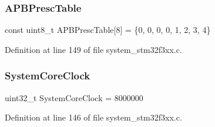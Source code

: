 \subsubsection{A\+P\+B\+Presc\+Table}
{\footnotesize\ttfamily const uint8\+\_\+t A\+P\+B\+Presc\+Table[8] = \{0, 0, 0, 0, 1, 2, 3, 4\}}



Definition at line 149 of file system\+\_\+stm32f3xx.\+c.

\mbox{\label{group___s_t_m32_f3xx___system___private___variables_gaa3cd3e43291e81e795d642b79b6088e6}} 
\subsubsection{System\+Core\+Clock}
{\footnotesize\ttfamily uint32\+\_\+t System\+Core\+Clock = 8000000}



Definition at line 146 of file system\+\_\+stm32f3xx.\+c.

